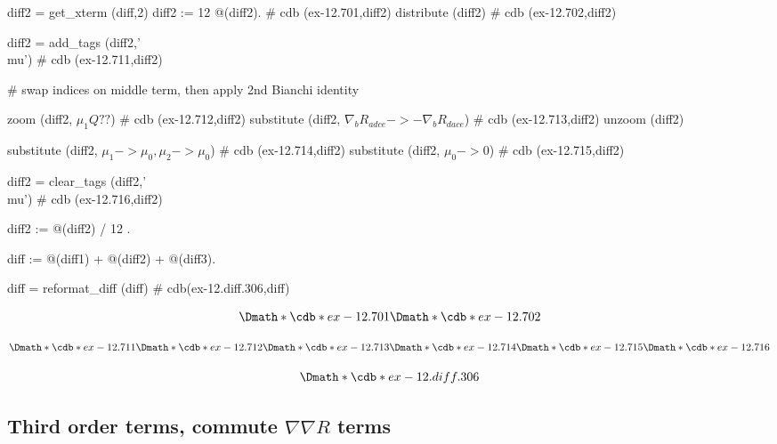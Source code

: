 \documentclass[12pt]{cdblatex}
\begin{document}
\begin{cadabra}
   diff2  = get_xterm (diff,2)
   diff2 := 12 @(diff2).                                                        # cdb (ex-12.701,diff2)
   distribute (diff2)                                                           # cdb (ex-12.702,diff2)

   diff2 = add_tags (diff2,'\\mu')                                              # cdb (ex-12.711,diff2)

   # swap indices on middle term, then apply 2nd Bianchi identity

   zoom       (diff2, $\mu_{1} Q??$)                                            # cdb (ex-12.712,diff2)
   substitute (diff2, $\nabla_{b}{R_{a d c e}} -> - \nabla_{b}{R_{d a c e}}$)   # cdb (ex-12.713,diff2)
   unzoom     (diff2)

   substitute (diff2, $\mu_{1} -> \mu_{0}, \mu_{2} -> \mu_{0}$)                 # cdb (ex-12.714,diff2)
   substitute (diff2, $\mu_{0} -> 0$)                                           # cdb (ex-12.715,diff2)

   diff2 = clear_tags (diff2,'\\mu')                                            # cdb (ex-12.716,diff2)

   diff2 := @(diff2) / 12 .

   diff := @(diff1) + @(diff2) + @(diff3).

   diff  = reformat_diff (diff)                                                 # cdb(ex-12.diff.306,diff)
\end{cadabra}

\clearpage

\begin{dgroup*}
   \Dmath*{\cdb*{ex-12.701}}
   \Dmath*{\cdb*{ex-12.702}}
\end{dgroup*}

\begin{dgroup*}
   \Dmath*{\cdb*{ex-12.711}}
   \Dmath*{\cdb*{ex-12.712}}
   \Dmath*{\cdb*{ex-12.713}}
   \Dmath*{\cdb*{ex-12.714}}
   \Dmath*{\cdb*{ex-12.715}}
   \Dmath*{\cdb*{ex-12.716}}
\end{dgroup*}

\begin{dgroup*}
   \Dmath*{\cdb*{ex-12.diff.306}}
\end{dgroup*}

\clearpage

\subsection*{Third order terms, commute $\nabla\nabla R$ terms}
\end{document}
